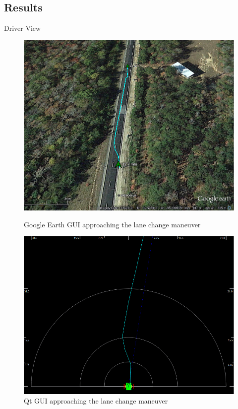 \documentclass{beamer}
\begin{document}
  \subsection{Results}

    \begin{frame}{Driver View}
      \begin{figure}[ht] \centering
        \begin{minipage}[b]{0.45\linewidth} \centering 
          \includegraphics[width=\textwidth]{../graphics/lane_change.png}
          \caption{Google Earth GUI approaching the lane change maneuver}
        \end{minipage}
        \hspace{0.5cm}
        \begin{minipage}[b]{0.45\linewidth} \centering
          \includegraphics[width=\textwidth]{../graphics/lane_change_mono.png} 
          \caption{Qt GUI approaching the lane change maneuver}
        \end{minipage}
    \end{figure}
    \end{frame}
\end{document}
